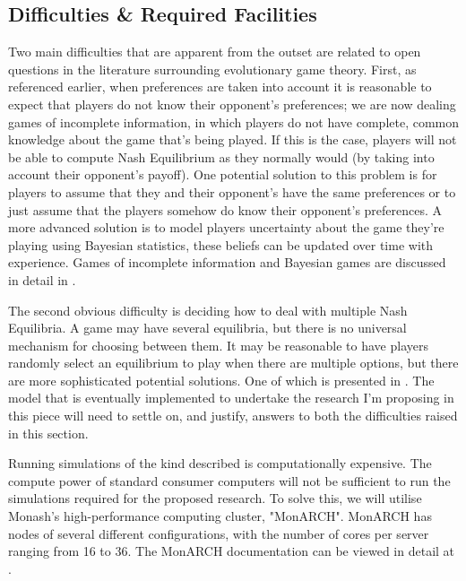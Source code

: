 \documentclass[11pt]{article}
\newcommand*{\np}{\par\noindent\newline}
\begin{document}
\subsection{Difficulties \& Required Facilities}
Two main difficulties that are apparent from the outset are related to open
questions in the literature surrounding evolutionary game theory. First, as
referenced earlier, when preferences are taken into account it is reasonable to
expect that players do not know their opponent's preferences; we are now
dealing games of incomplete information, in which players do not have complete,
common knowledge about the game that's being played. If this is the case, players will not be able to compute Nash Equilibrium as they normally
would (by taking into account their opponent's payoff). One potential solution
to this problem is for players to assume that they and their opponent's have
the same preferences or to just assume that the players somehow do know their
opponent's preferences. A more advanced solution is to model players
uncertainty about the game they're playing using Bayesian statistics, these
beliefs can be updated over time with experience. Games of incomplete
information and Bayesian games are discussed in detail in
\cite{shoham_multiagent_nodate}.
\np The second obvious difficulty is deciding how to deal with multiple Nash
Equilibria. A game may have several equilibria, but there is no universal
mechanism for choosing between them. It may be reasonable to have players
randomly select an equilibrium to play when there are multiple options, but
there are more sophisticated potential solutions. One of which is presented in
\cite{binmore_evolutionary_1999}. The model that is eventually implemented to
undertake the research I'm proposing in this piece will need to
settle on, and justify, answers to both the difficulties raised in this section.
\np Running simulations of the kind described is computationally expensive. The
compute power of standard consumer computers will not be sufficient to run the
simulations required for the proposed research. To solve this, we will utilise
Monash's high-performance computing cluster, "MonARCH". MonARCH has nodes of
several different configurations, with the number of cores per server ranging
from 16 to 36. The MonARCH documentation can be viewed in detail at
\cite{michnowicz_monarch_nodate}.
\end{document}
